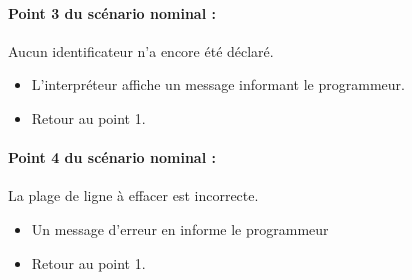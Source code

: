             \paragraph{Point 3 du scénario nominal :} Aucun identificateur n'a encore été
            déclaré.
            \begin{itemize}
                \item L'interpréteur affiche un message informant le programmeur.
                \item Retour au point 1.
            \end{itemize}

            \paragraph{Point 4 du scénario nominal :} La plage de ligne à effacer est
            incorrecte.
            \begin{itemize}
                \item Un message d'erreur en informe le programmeur
                \item Retour au point 1.
            \end{itemize}
